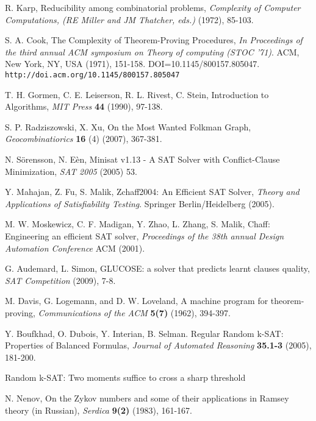 \documentclass[paper=a4, fontsize=11pt]{scrartcl} %
\begin{document}
\begin{thebibliography}{9}

 R. Karp, Reducibility among combinatorial problems, \emph{Complexity of Computer Computations, (RE Miller and JM Thatcher, eds.)} (1972), 85-103.

 S. A. Cook, The Complexity of Theorem-Proving Procedures, \emph{In Proceedings of the third annual ACM symposium on Theory of computing (STOC '71)}. ACM, New York, NY, USA (1971), 151-158. DOI=10.1145/800157.805047. {\tt http://doi.acm.org/10.1145/800157.805047}

 T. H. Gormen, C. E. Leiserson, R. L. Rivest, C. Stein, Introduction to Algorithms, \emph{MIT Press} \textbf{44} (1990), 97-138.

 S. P. Radziszowski, X. Xu, On the Most Wanted Folkman Graph, \emph{Geocombinatiorics} \textbf{16} (4) (2007), 367-381.

 N. S\"{o}rensson, N. E\`{e}n, Minisat v1.13 - A SAT Solver with Conflict-Clause Minimization, \emph{SAT 2005} (2005) 53.

 Y. Mahajan, Z. Fu, S. Malik, Zchaff2004: An Efficient SAT Solver, \emph{Theory and Applications of Satisfiability Testing}. Springer Berlin/Heidelberg (2005).

 M. W. Moskewicz, C. F. Madigan, Y. Zhao, L. Zhang, S. Malik, Chaff: Engineering an efficient SAT solver, \emph{Proceedings of the 38th annual Design Automation Conference} ACM (2001).

 G. Audemard, L. Simon, GLUCOSE: a solver that predicts learnt clauses quality, \emph{SAT Competition} (2009), 7-8.

 M. Davis, G. Logemann, and D. W. Loveland, A machine program for theorem-proving, \emph{Communications of the ACM} \textbf{5(7)} (1962), 394-397.

 Y. Boufkhad, O. Dubois, Y. Interian, B. Selman. Regular Random k-SAT: Properties of Balanced Formulas, \emph{Journal of Automated Reasoning} \textbf{35.1-3} (2005), 181-200.

 Random k-SAT: Two moments suffice to cross a sharp threshold

 N. Nenov, On the Zykov numbers and some of their applications in Ramsey theory (in Russian), \emph{Serdica} \textbf{9(2)} (1983), 161-167.

\end{thebibliography}
\end{document}
